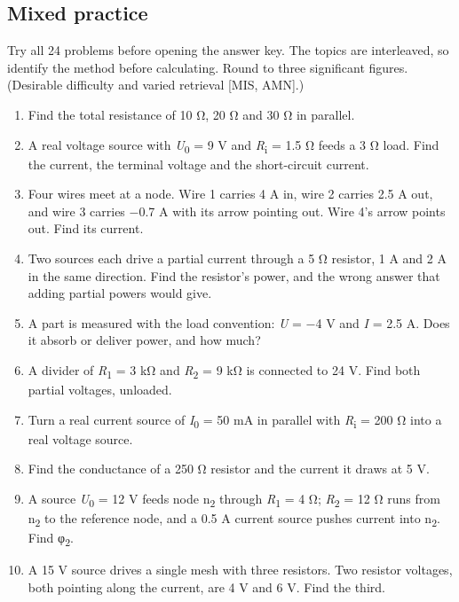 \documentclass[11pt]{article}
\begin{document}
\begin{keepsection}
\section{Mixed practice}

Try all 24 problems before opening the answer key. The topics are interleaved, so identify the method before calculating. Round to three significant figures. (Desirable difficulty and varied retrieval [MIS, AMN].)

\begin{enumerate}
\item Find the total resistance of 10 Ω, 20 Ω and 30 Ω in parallel.
\item A real voltage source with \textit{U}\textsubscript{0} = 9 V and \textit{R}\textsubscript{i} = 1.5 Ω feeds a 3 Ω load. Find the current, the terminal voltage and the short-circuit current.
\item Four wires meet at a node. Wire 1 carries 4 A in, wire 2 carries 2.5 A out, and wire 3 carries \ensuremath{-}0.7 A with its arrow pointing out. Wire 4’s arrow points out. Find its current.
\item Two sources each drive a partial current through a 5 Ω resistor, 1 A and 2 A in the same direction. Find the resistor’s power, and the wrong answer that adding partial powers would give.
\item A part is measured with the load convention: \textit{U} = \ensuremath{-}4 V and \textit{I} = 2.5 A. Does it absorb or deliver power, and how much?
\item A divider of \textit{R}\textsubscript{1} = 3 kΩ and \textit{R}\textsubscript{2} = 9 kΩ is connected to 24 V. Find both partial voltages, unloaded.
\item Turn a real current source of \textit{I}\textsubscript{0} = 50 mA in parallel with \textit{R}\textsubscript{i} = 200 Ω into a real voltage source.
\item Find the conductance of a 250 Ω resistor and the current it draws at 5 V.
\item A source \textit{U}\textsubscript{0} = 12 V feeds node n\textsubscript{2} through \textit{R}\textsubscript{1} = 4 Ω; \textit{R}\textsubscript{2} = 12 Ω runs from n\textsubscript{2} to the reference node, and a 0.5 A current source pushes current into n\textsubscript{2}. Find φ\textsubscript{2}.
\item A 15 V source drives a single mesh with three resistors. Two resistor voltages, both pointing along the current, are 4 V and 6 V. Find the third.

\end{enumerate}
\end{keepsection}
\end{document}
